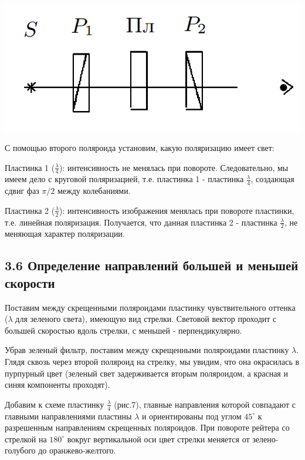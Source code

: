 \documentclass[a4paper,12pt]{report}
\begin{document}
\begin{center}
    \includegraphics[scale = 0.5]{3.png}
\end{center}

С помощью второго поляроида установим, какую поляризацию имеет свет:

Пластинка 1 ($\frac{\lambda}{4}$):
интенсивность не менялась при повороте. Следовательно, мы имеем дело с круговой поляризацией, т.е. пластинка 1 - пластинка $\frac{\lambda}{4}$, создающая сдвиг фаз $\pi/2$ между колебаниями.

Пластинка 2 ($\frac{\lambda}{2}$):
интенсивность изображения менялась при повороте пластинки, т.е. линейная поляризация. Получается, что данная пластинка 2 - пластинка $\frac{\lambda}{2}$, не меняющая характер поляризации.

\subsection*{3.6 Определение направлений большей и меньшей скорости}

Поставим между скрещенными поляроидами пластинку чувствительного оттенка ($\lambda$ для зеленого света), имеющую вид стрелки. Световой вектор проходит с большей скоростью вдоль стрелки, с меньшей - перпендикулярно.

Убрав зеленый фильтр, поставим между скрещенными поляроидами пластинку $\lambda$. Глядя сквозь через второй поляроид на стрелку, мы увидим, что она окрасилась в пурпурный цвет (зеленый свет задерживается вторым поляроидом, а красная и синяя компоненты проходят).

Добавим к схеме пластинку $\frac{\lambda}{4}$ (рис.7), главные направления которой совпадают с главными направлениями пластины $\lambda$ и ориентированы под углом $45^{\circ}$ к разрешенным направлениям скрещенных поляроидов. При повороте рейтера со стрелкой на $180^{\circ}$ вокруг вертикальной оси цвет стрелки меняется от зелено-голубого до оранжево-желтого.
\end{document}

